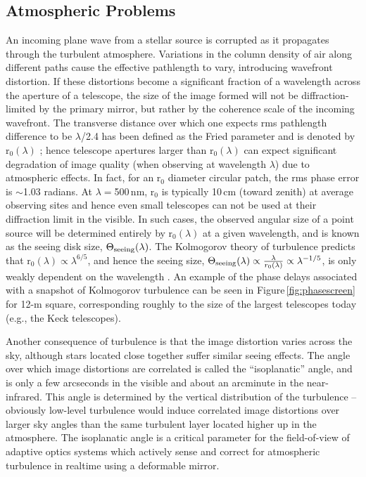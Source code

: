 \documentclass[12pt]{article}
\begin{document}
\subsection{Atmospheric Problems}
\label{section:seeing}
An incoming plane wave from a stellar source is corrupted as it
propagates through the turbulent atmosphere.  Variations in the column
density of air along different paths cause the effective pathlength to
vary, introducing wavefront distortion.  If these distortions become a
significant fraction of a wavelength across the aperture of a
telescope, the size of the image formed will not be
diffraction-limited by the primary mirror, but rather by the coherence
scale of the incoming wavefront.  The transverse distance over which
one expects rms pathlength difference to be $\lambda$/2.4 has been
defined as the Fried parameter and is denoted by r$_0(\lambda)$
\citep{fried65}; hence telescope apertures larger than r$_0(\lambda)$
can expect significant degradation of image quality (when observing at
wavelength $\lambda$) due to atmospheric effects.  In fact, for an
r$_0$ diameter circular patch, the rms phase error is $\sim$1.03
radians.  At $\lambda=$500\,nm, r$_0$ is typically 10\,cm (toward
zenith) at average observing sites and hence even small telescopes can
not be used at their diffraction limit in the visible.  In such cases,
the observed angular size of a point source will be determined
entirely by r$_0(\lambda)$ at a given wavelength, and is known as the
seeing disk size, $\Theta_{\rm seeing}(\lambda)$.  The Kolmogorov
theory of turbulence \citep{kolmogorov61} predicts that r$_0(\lambda)
\propto \lambda^{6/5}$, and hence the seeing size, $\Theta_{\rm
  seeing}(\lambda) \propto \frac{\lambda}{r_0(\lambda)} \propto
\lambda^{-1/5}$, is only weakly dependent on the wavelength
\citep{fried65}.  An example of the phase delays associated with a
snapshot of Kolmogorov turbulence can be seen in
Figure\,\ref{fig:phasescreen} for 12-m square, corresponding roughly
to the size of the largest telescopes today (e.g., the Keck
telescopes).

Another consequence of turbulence is that the image distortion varies
across the sky, although stars located close together suffer similar
seeing effects.  The angle over which image distortions are correlated
is called the ``isoplanatic'' angle, and is only a few arcseconds in
the visible and about an arcminute in the near-infrared.  This angle
is determined by the vertical distribution of the turbulence --
obviously low-level turbulence would induce correlated image
distortions over larger sky angles than the same turbulent layer
located higher up in the atmosphere. The isoplanatic angle is a
critical parameter for the field-of-view of adaptive optics systems
which actively sense and correct for atmospheric turbulence in
realtime using a deformable mirror.
\end{document}
